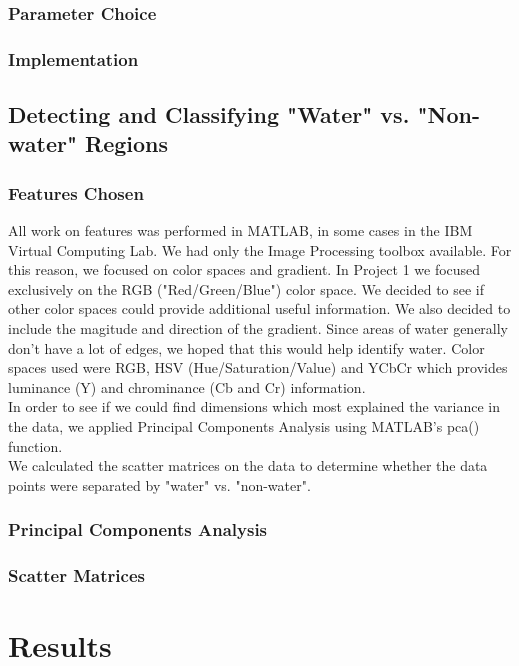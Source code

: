\documentclass[12pt]{article}
\begin{document}
	\subsubsection{Parameter Choice}
	\subsubsection{Implementation}
	\subsection{Detecting and Classifying "Water" vs. "Non-water" Regions}
	\subsubsection{Features Chosen}
	All work on features was performed in MATLAB, in some cases in the IBM Virtual Computing Lab. We had only the Image Processing toolbox available. For this reason, we focused on color spaces and gradient. In Project 1 we focused exclusively on the RGB ("Red/Green/Blue") color space. We decided to see if other color spaces could provide additional useful information. We also decided to include the magitude and direction of the gradient. Since areas of water generally don't have a lot of edges, we hoped that this would help identify water. Color spaces used were RGB, HSV (Hue/Saturation/Value) and YCbCr which provides luminance (Y) and chrominance (Cb and Cr) information.\\
	In order to see if we could find dimensions which most explained the variance in the data, we applied Principal Components Analysis using MATLAB's pca() function. \\
	We calculated the scatter matrices on the data to determine whether the data points were separated by "water" vs. "non-water".
	\subsubsection{Principal Components Analysis}
	\subsubsection{Scatter Matrices}
	
\section{Results}
\end{document}
